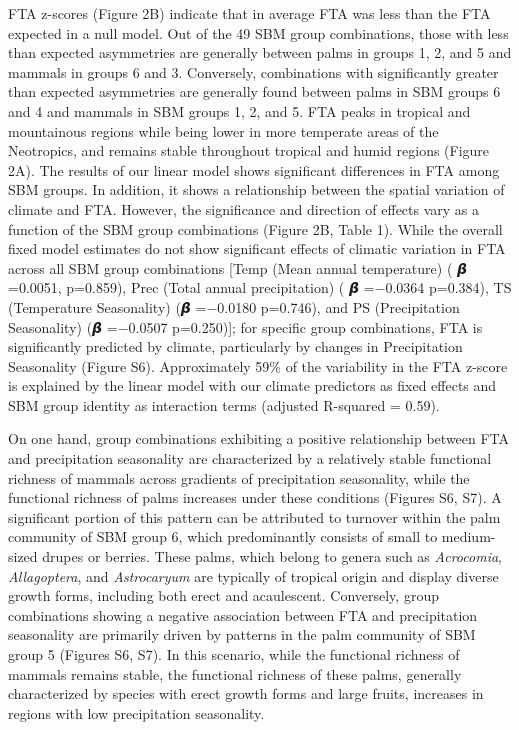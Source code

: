 \documentclass[
]{agujournal2019}
\begin{document}
FTA z-scores (Figure 2B) indicate that in average FTA was less than the
FTA expected in a null model. Out of the 49 SBM group combinations,
those with less than expected asymmetries are generally between palms in
groups 1, 2, and 5 and mammals in groups 6 and 3. Conversely,
combinations with significantly greater than expected asymmetries are
generally found between palms in SBM groups 6 and 4 and mammals in SBM
groups 1, 2, and 5. FTA peaks in tropical and mountainous regions while
being lower in more temperate areas of the Neotropics, and remains
stable throughout tropical and humid regions (Figure 2A). The results of
our linear model shows significant differences in FTA among SBM groups.
In addition, it shows a relationship between the spatial variation of
climate and FTA. However, the significance and direction of effects vary
as a function of the SBM group combinations (Figure 2B, Table 1). While
the overall fixed model estimates do not show significant effects of
climatic variation in FTA across all SBM group combinations {[}Temp
(Mean annual temperature) ( 𝞫 =0.0051, p=0.859), Prec (Total annual
precipitation) ( 𝞫 =−0.0364 p=0.384), TS (Temperature Seasonality) (𝞫
=−0.0180 p=0.746), and PS (Precipitation Seasonality) (𝞫 =−0.0507
p=0.250){]}; for specific group combinations, FTA is significantly
predicted by climate, particularly by changes in Precipitation
Seasonality (Figure S6). Approximately 59\% of the variability in the
FTA z-score is explained by the linear model with our climate predictors
as fixed effects and SBM group identity as interaction terms (adjusted
R-squared = 0.59).

On one hand, group combinations exhibiting a positive relationship
between FTA and precipitation seasonality are characterized by a
relatively stable functional richness of mammals across gradients of
precipitation seasonality, while the functional richness of palms
increases under these conditions (Figures S6, S7). A significant portion
of this pattern can be attributed to turnover within the palm community
of SBM group 6, which predominantly consists of small to medium-sized
drupes or berries. These palms, which belong to genera such as
\emph{Acrocomia}, \emph{Allagoptera}, and \emph{Astrocaryum} are
typically of tropical origin and display diverse growth forms, including
both erect and acaulescent. Conversely, group combinations showing a
negative association between FTA and precipitation seasonality are
primarily driven by patterns in the palm community of SBM group 5
(Figures S6, S7). In this scenario, while the functional richness of
mammals remains stable, the functional richness of these palms,
generally characterized by species with erect growth forms and large
fruits, increases in regions with low precipitation seasonality.
\end{document}
